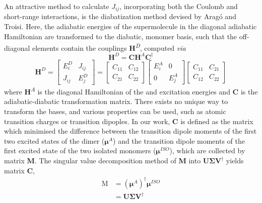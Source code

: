 An attractive method to calculate $J_{ij}$, incorporating both the Coulomb and short-range interactions, is the diabatization method devised by Arag\'o and Troisi. Here, the adiabatic energies of the supermolecule in the diagonal adiabatic Hamiltonian are transformed to the diabatic, monomer basis, such that the off-diagonal elements contain the couplings  \textbf{H}\textsuperscript{\textit{D}}, computed \textit{via}
\begin{equation}
\textbf{H}^{D}=\textbf{C}\textbf{H}^{A}\textbf{C}^\dag
\label{equation: diabatic hamiltonian}
\end{equation}
\begin{equation}
\label{equation: diabatic matrix}
\textbf{H}^D=
\begin{bmatrix}
E_{i}^D & J_{ij}\\
J_{ij} & E_{j}^D
\end{bmatrix}
=
\begin{bmatrix}
C_{11} & C_{12}\\
C_{21} & C_{22}
\end{bmatrix}
\begin{bmatrix}
E_{i}^A & 0\\
0 & E_{j}^A
\end{bmatrix}
\begin{bmatrix}
C_{11} & C_{21}\\
C_{12} & C_{22}
\end{bmatrix}
\end{equation} 
where \textbf{H}\textsuperscript{\textit{A}} is the diagonal Hamiltonian of the \sone{} and \stwo{} excitation energies and \textbf{C} is the adiabatic-diabatic transformation matrix. There exists no unique way to transform the bases, and various properties can be used, such as atomic transition charges or transition dipoples. In our work, \textbf{C} is defined as the matrix which minimised the difference between the transition dipole moments of the first two excited states of the dimer ($\bm{\mu}^{A}$) and the transition dipole moments of the first excited state of the two isolated monomers ($\bm{\mu}^{ISO}$), which are collected by matrix \textbf{M}. The singular value decomposition method of \textbf{M} into $\bm{U\Sigma{}V}^{\dag}$ yields matrix \textbf{C},
\begin{equation}
\begin{split}
    \bm{\mathrm{M}}&=(\bm{\mu}^{A})^{\dag}\bm{\mu}^{ISO}\\
    &=\bm{U\Sigma{}V}^{\dag}
    \end{split}
\end{equation}

